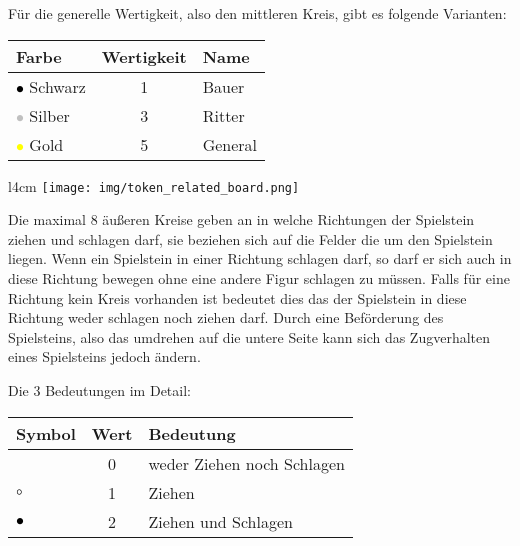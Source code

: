 \documentclass{article}
\begin{document}
	\begin{flushleft}
	
	Für die generelle Wertigkeit, also den mittleren Kreis, gibt es folgende Varianten:
	
	\vspace{0.2cm}
	
	\begin{tabular}{lcl}
	\hline
	Farbe & Wertigkeit & Name \\ \hline 
	\textcolor{black}{$\bullet$} 	Schwarz & 1 & Bauer \\ 
	\textcolor{silver}{$\bullet$} 		Silber	& 3 & Ritter \\ 
	\textcolor{yellow}{$\bullet$} 	Gold	& 5 & General \\ 
	\end{tabular}

	\end{flushleft}
	
	\vspace{0.2cm}
	
	\begin{wrapfigure}{l}{4cm}
	\centering
	\texttt{[image: img/token\_related\_board.png]}
	\end{wrapfigure}
	
	Die maximal 8 äußeren Kreise geben an in welche Richtungen der Spielstein ziehen und 
	schlagen darf, sie beziehen sich auf die Felder die um den Spielstein liegen.
	Wenn ein Spielstein in einer Richtung schlagen darf, so darf er sich auch in 
	diese Richtung bewegen ohne eine andere Figur schlagen zu müssen. Falls für eine
	Richtung kein Kreis vorhanden ist bedeutet dies das der Spielstein in diese Richtung
	weder schlagen noch ziehen darf. Durch eine Beförderung des Spielsteins, also das umdrehen
	auf die untere Seite kann sich das Zugverhalten eines Spielsteins jedoch ändern.

	\vspace{0.2cm}
	
	\begin{flushleft}
	Die 3 Bedeutungen im Detail: 
	\end{flushleft}
	
	\vspace{0.2cm}
	
	\begin{tabular}{lcl}
	\hline
	Symbol & Wert & Bedeutung  \\  \hline
									& 0 & weder Ziehen noch Schlagen \\
	\textcolor{black}{$\circ$}		& 1 & Ziehen \\ 
	\textcolor{black}{$\bullet$} 	& 2 & Ziehen und Schlagen  \\ 
	\end{tabular}
	 
\end{document}
